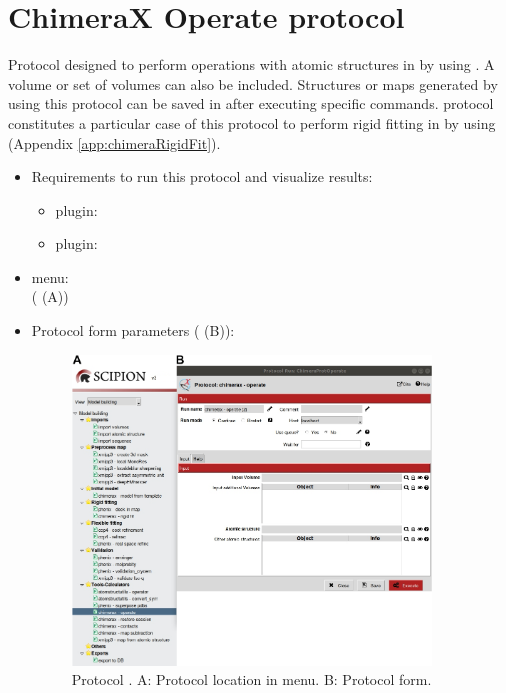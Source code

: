 \section{ChimeraX Operate protocol}
\label{app:chimeraOperate}%

Protocol designed to perform operations with atomic structures in \scipion by using \chimera. A volume or set of volumes can also be included. Structures or maps generated by using this protocol can be saved in \scipion after executing specific \chimera commands. \chimera {} protocol constitutes a particular case of this protocol to perform rigid fitting in \scipion by using \chimera (Appendix \ref{app:chimeraRigidFit}).

 \begin{itemize}
  \item Requirements to run this protocol and visualize results:
                \begin{itemize}
                    \item \scipion plugin: 
                    \item \scipion plugin: 
                \end{itemize}
  \item \scipion menu:\\
                 ( (A))
  
  \item Protocol form parameters ( (B)):
  
                \begin{figure}[H]
                \centering 
                \captionsetup{width=.7\linewidth} 
                \includegraphics[width=0.90\textwidth]{Images_appendix/Fig117.pdf}
                \caption{Protocol . A: Protocol location in \scipion menu. B: Protocol form.}
                \label{fig:app_protocol_chimera_2}
                \end{figure}
    

\end{itemize}
